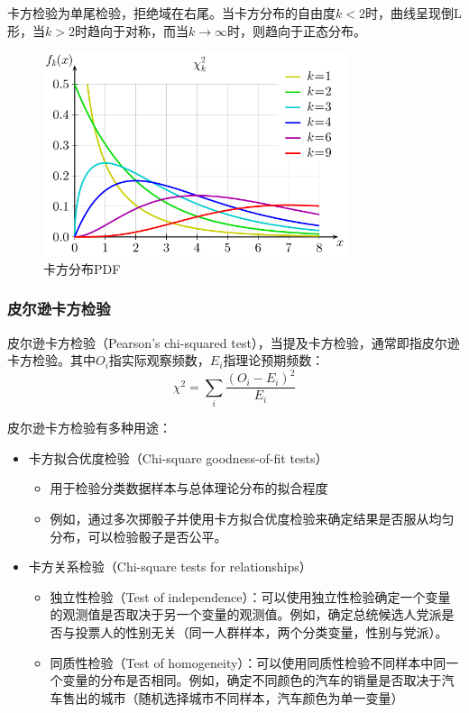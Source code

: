 \documentclass[11pt]{article}
\begin{document}
卡方检验为单尾检验，拒绝域在右尾。当卡方分布的自由度$k<2$时，曲线呈现倒L形，当$k>2$时趋向于对称，而当$k\rightarrow \infty$时，则趋向于正态分布。
\begin{figure}[H]
    \centering
    \includegraphics[width=0.8\textwidth]{fig/chi-squared.png}
    \caption{卡方分布PDF}
    \label{fig:chi-squared}
\end{figure}

\subsubsection{皮尔逊卡方检验}

皮尔逊卡方检验（Pearson's chi-squared test），当提及卡方检验，通常即指皮尔逊卡方检验。其中$O_i$指实际观察频数，$E_i$指理论预期频数：
\begin{equation*}
    \chi^2 = \sum_i \frac{(O_i - E_i)^2}{E_i}
\end{equation*}

皮尔逊卡方检验有多种用途：
\begin{itemize}
    \item 卡方拟合优度检验（Chi-square goodness-of-fit tests）
    \begin{itemize}
        \item 用于检验分类数据样本与总体理论分布的拟合程度
        \item 例如，通过多次掷骰子并使用卡方拟合优度检验来确定结果是否服从均匀分布，可以检验骰子是否公平。
    \end{itemize}
    \item 卡方关系检验（Chi-square tests for relationships）
    \begin{itemize}
        \item 独立性检验（Test of independence）：可以使用独立性检验确定一个变量的观测值是否取决于另一个变量的观测值。例如，确定总统候选人党派是否与投票人的性别无关（同一人群样本，两个分类变量，性别与党派）。
        \item 同质性检验（Test of homogeneity）：可以使用同质性检验不同样本中同一个变量的分布是否相同。例如，确定不同颜色的汽车的销量是否取决于汽车售出的城市（随机选择城市不同样本，汽车颜色为单一变量）
    \end{itemize}
\end{itemize}
\end{document}
